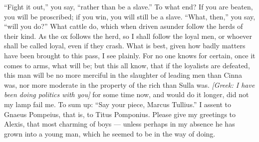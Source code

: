  ``Fight it out,'' you say, ``rather than be a slave.'' To what end? If you are beaten, you will be proscribed; if you win, you will still be a slave. ``What, then,'' you say, ``will you do?'' What cattle do, which when driven asunder follow the herds of their kind. As the ox follows the herd, so I shall follow the loyal men, or whoever shall be called loyal, even if they crash. What is best, given how badly matters have been brought to this pass, I see plainly. For no one knows for certain, once it comes to arms, what will be; but this all know, that if the loyalists are defeated, this man will be no more merciful in the slaughter of leading men than Cinna was, nor more moderate in the property of the rich than Sulla was. \textit{[Greek: I have been doing politics with you]} for some time now, and would do it longer, did not my lamp fail me. To sum up: ``Say your piece, Marcus Tullius.'' I assent to Gnaeus Pompeius, that is, to Titus Pomponius. Please give my greetings to Alexis, that most charming of boys --- unless perhaps in my absence he has grown into a young man, which he seemed to be in the way of doing.
